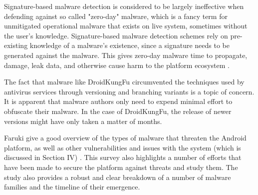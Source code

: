 Signature-based malware detection is considered to be largely ineffective when defending against so called "zero-day" malware, which is a fancy term for unmitigated operational malware that exists on live system, sometimes without the user's knowledge.
Signature-based malware detection schemes rely on pre-existing knowledge of a malware's existence, since a signature needs to be generated against the malware.
This gives zero-day malware time to propagate, damage, leak data, and otherwise cause harm to the platform ecosystem \cite{You2010}.

The fact that malware like DroidKungFu circumvented the techniques used by antivirus services through versioning and branching variants is a topic of concern.
It is apparent that malware authors only need to expend minimal effort to obfuscate their malware.
In the case of DroidKungFu, the release of newer versions might have only taken a matter of months.

Faruki \etal give a good overview of the types of malware that threaten the Android platform, as well as other vulnerabilities and issues with the system (which is discussed in Section IV) \cite{Faruki2015}.
This survey also highlights a number of efforts that have been made to secure the platform against threats and study them.
The study also provides a robust and clear breakdown of a number of malware families and the timeline of their emergence.
